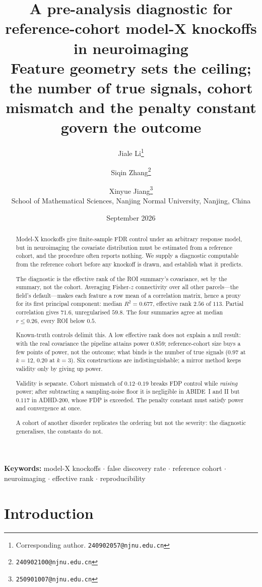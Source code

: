 \documentclass[11pt,a4paper]{article}
\title{\bfseries A pre-analysis diagnostic for reference-cohort model-X
knockoffs in neuroimaging\\[6pt]
\large Feature geometry sets the ceiling; the number of true signals, cohort
mismatch and the penalty constant govern the outcome}
\author{%
  Jiale Li\thanks{Corresponding author. \texttt{240902057@njnu.edu.cn}} \and
  Siqin Zhang\thanks{\texttt{240902100@njnu.edu.cn}} \and
  Xinyue Jiang\thanks{\texttt{250901007@njnu.edu.cn}}%
  \\[4pt]
  \small School of Mathematical Sciences, Nanjing Normal University,
  Nanjing, China
}
\date{September 2026}
\begin{document}
\maketitle

\begin{abstract}
\noindent
Model-X knockoffs give finite-sample FDR control under an arbitrary response
model, but in neuroimaging the covariate distribution must be estimated from
a reference cohort, and the procedure often reports
nothing. We supply a diagnostic computable from the reference cohort before any
knockoff is drawn, and establish what it predicts.

The diagnostic is the effective rank of the ROI summary's covariance,
set by the summary, not the cohort. Averaging Fisher-$z$ connectivity
over all other parcels---the field's default---makes each feature a row mean
of a correlation matrix, hence a proxy for its first principal component:
median $R^2=0.677$, effective rank $2.56$ of $113$. Partial correlation gives
$71.6$, unregularised $59.8$. The four summaries agree at median $r\le0.26$,
every ROI below $0.5$.

Known-truth controls delimit this. A low effective rank does not
explain a null result: with the real
covariance the pipeline attains power $0.859$; reference-cohort size buys a few points of power,
not the outcome; what binds is the number of true signals ($0.97$ at $k=12$, $0.20$ at $k=3$). Six constructions
are indistinguishable; a mirror method keeps validity only by giving up power.

Validity is separate. Cohort mismatch of $0.12$--$0.19$ breaks FDP control
while \emph{raising} power; after subtracting a sampling-noise floor it is
negligible in ABIDE~I and II but $0.117$ in ADHD-200, whose FDP is exceeded. The penalty constant must satisfy power and convergence at once.

A cohort of another disorder replicates the ordering but not the severity:
the diagnostic generalises, the constants do not.
\end{abstract}

\noindent\textbf{Keywords:} model-X knockoffs $\cdot$ false discovery rate
$\cdot$ reference cohort $\cdot$ neuroimaging $\cdot$ effective rank
$\cdot$ reproducibility

\bigskip

\section{Introduction}
\label{sec:intro}
\end{document}
